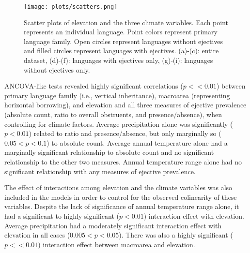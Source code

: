 \documentclass{article}
\begin{document}
\begin{figure}
	\texttt{[image: plots/scatters.png]}
	\caption{Scatter plots of elevation and the three climate variables. Each point represents an individual language. Point colors represent primary language family. Open circles represent languages without ejectives and filled circles represent languages with ejectives. (a)-(c): entire dataset, (d)-(f): languages with ejectives only, (g)-(i): languages without ejectives only.}
	\label{fig:scatterplots}
\end{figure}

ANCOVA-like tests revealed highly significant correlations ($p << 0.01$) between primary language family (i.e., vertical inheritance), macroarea (representing horizontal borrowing), and elevation and all three measures of ejective prevalence (absolute count, ratio to overall obstruents, and presence/absence), when controlling for climate factors. Average precipitation alone was significantly ($ p < 0.01$) related to ratio and presence/absence, but only marginally so ($0.05 < p < 0.1$) to absolute count. Average annual temperature alone had a marginally significant relationship to absolute count and no significant relationship to the other two measures. Annual temperature range alone had no significant relationship with any measures of ejective prevalence. 

The effect of interactions among elevation and the climate variables was also included in the models in order to control for the observed colinearity of these variables. Despite the lack of significance of annual temperature range alone, it had a significant to highly significant ($p < 0.01$) interaction effect with elevation. Average precipitation had a moderately significant interaction effect with elevation in all cases ($0.005 < p < 0.05$). There was also a highly significant ($p << 0.01$) interaction effect between macroarea and elevation.
\end{document}
